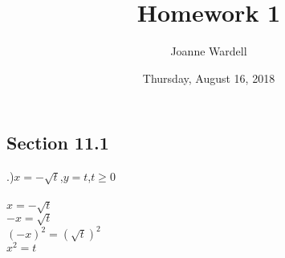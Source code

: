\documentclass[12pt]{article}
\title{\vspace{-2.0cm}Homework 1}
\author{Joanne Wardell}
\date{Thursday, August 16, 2018}
\begin{document}
\maketitle

\subsection*{Section 11.1}
.)$x=-\sqrt{t}$,\hspace{10pt}$y=t$,\hspace{10pt}$t \geq 0$\\\\
$x=-\sqrt{t}$\\
$-x=\sqrt{t}$\\
$(-x)^{2}=(\sqrt{t})^{2}$\\
$x^{2}=t$\\\\
\end{document}
